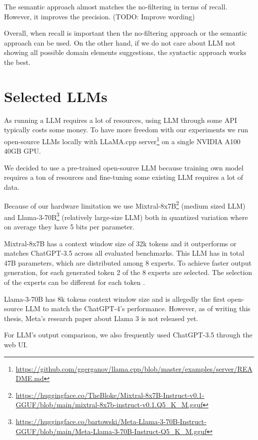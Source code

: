 The semantic approach almost matches the no-filtering in terms of recall. However, it improves the precision. (TODO: Improve wording)

Overall, when recall is important then the no-filtering approach or the semantic approach can be used. On the other hand, if we do not care about LLM not showing all possible domain elements suggestions, the syntactic approach works the best.


\section{Selected LLMs}

As running a LLM requires a lot of resources, using LLM through some API typically costs some money. To have more freedom with our experiments we run open-source LLMs locally with LLaMA.cpp server\footnote{\url{https://github.com/ggerganov/llama.cpp/blob/master/examples/server/README.md}} on a single NVIDIA A100 40GB GPU.

We decided to use a pre-trained open-source LLM because training own model requires a ton of resources and fine-tuning some existing LLM requires a lot of data.

Because of our hardware limitation we use Mixtral-8x7B\footnote{\url{https://huggingface.co/TheBloke/Mixtral-8x7B-Instruct-v0.1-GGUF/blob/main/mixtral-8x7b-instruct-v0.1.Q5_K_M.gguf}} (medium sized LLM) \cite{Jiang2024} and Llama-3-70B\footnote{\url{https://huggingface.co/bartowski/Meta-Llama-3-70B-Instruct-GGUF/blob/main/Meta-Llama-3-70B-Instruct-Q5_K_M.gguf}} (relatively large-size LLM) both in quantized variation where on average they have 5 bits per parameter.

Mixtral-8x7B has a context window size of 32k tokens and it outperforms or matches ChatGPT-3.5 across all evaluated benchmarks. This LLM has in total 47B parameters, which are distributed among 8 experts. To achieve faster output generation, for each generated token 2 of the 8 experts are selected. The selection of the experts can be different for each token \cite{Jiang2024}.

Llama-3-70B has 8k tokens context window size and is allegedly  the first open-source LLM to match the ChatGPT-4's performance. However, as of writing this thesis, Meta's research paper about Llama 3 is not released yet.

For LLM's output comparison, we also frequently used ChatGPT-3.5 through the web UI. \\

